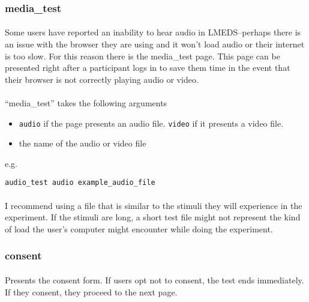 \subsubsection{media\_test}

\paragraph{}
Some users have reported an inability to hear audio in LMEDS--perhaps there is an issue with the browser they are using and it won't load audio or their internet is too slow.  For this reason there is the media\_test page.  This page can be presented right after a participant logs in to save them time in the event that their browser is not correctly playing audio or video.

\paragraph{}
``media\_test'' takes the following arguments

\begin{itemize}
\item \texttt{audio} if the page presents an audio file.  \texttt{video} if it presents a video file.
\item the name of the audio or video file
\end{itemize}

e.g.

\begin{lstlisting}
audio_test audio example_audio_file
\end{lstlisting}

\paragraph{}
I recommend using a file that is similar to the stimuli they will experience in the experiment.  If the stimuli are long, a short test file might not represent the kind of load the user's computer might encounter while doing the experiment.

\subsubsection{consent}

\paragraph{}
Presents the consent form.  If users opt not to consent, the test ends immediately.  If they consent, they proceed to the next page.

